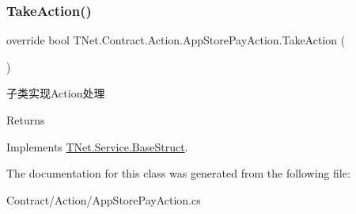\subsubsection{\texorpdfstring{Take\+Action()}{TakeAction()}}
{\footnotesize\ttfamily override bool T\+Net.\+Contract.\+Action.\+App\+Store\+Pay\+Action.\+Take\+Action (\begin{DoxyParamCaption}{ }\end{DoxyParamCaption})\hspace{0.3cm}{\ttfamily [virtual]}}



子类实现\+Action处理 

\begin{DoxyReturn}{Returns}

\end{DoxyReturn}


Implements \mbox{\hyperlink{class_t_net_1_1_service_1_1_base_struct_a5a1250b74d925d42066aebdefa36f54a}{T\+Net.\+Service.\+Base\+Struct}}.



The documentation for this class was generated from the following file\+:\begin{DoxyCompactItemize}
\item 
Contract/\+Action/App\+Store\+Pay\+Action.\+cs\end{DoxyCompactItemize}
